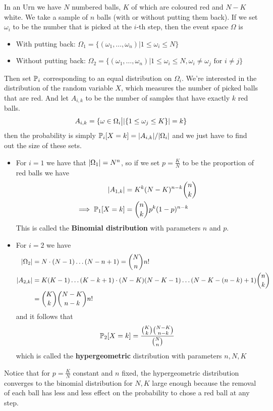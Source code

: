\begin{ex}
In an Urn we have $N$ numbered balls, $K$ of which are coloured red and $N-K$ white.
We take a sample of $n$ balls (with or without putting them back).
If we set $\omega_i$ to be the number that is picked at the $i$-th step, then the event space $\Omega$ is
\begin{itemize}
  \item With putting back: $\Omega_1 = \{(\omega_1, \ldots,\omega_n) \big\vert 1 \leq \omega_i \leq N\}$
  \item Without putting back: $\Omega_2 = \{(\omega_1, \ldots,\omega_n) \big\vert 1 \leq \omega_i \leq N, \omega_i \neq \omega_j  \text{ for } i \neq j\}$
\end{itemize}
Then set $\mathbb{P}_i$ corresponding to an equal distribution on $\Omega_i$. We're interested in the distribution of the random variable $X$, which measures the number of picked balls that are red.
And let $A_{i,k}$ to be the number of samples that have exactly $k$ red balls.
\begin{align*}
  A_{i,k} = \{\omega \in  \Omega_i \big\vert \vert\{1 \leq \omega_j \leq K\}\vert = k\}
\end{align*}
then the probability is simply $\mathbb{P}_i[X = k] = \vert A_{i,k}\vert/\vert\Omega_i\vert$ and we just have to find out the size of these sets.
\begin{itemize}
  \item For $i = 1$ we have that $\vert\Omega_1\vert = N^{n}$, so if we set $p = \frac{K}{N}$ to be the proportion of red balls we have
    \begin{align*}
      \vert A_{1,k}\vert &= K^{k}(N-K)^{n-k} \binom{n}{k}\\
      \implies \mathbb{P}_1[X = k] &= \binom{n}{k} p^{k}(1 - p)^{n-k}
    \end{align*}
    This is called the \textbf{Binomial distribution} with parameters $n$ and $p$.
  \item For $i = 2$ we have
    \begin{align*}
      \vert\Omega_2\vert &= N \cdot (N-1) \dots (N - n + 1) = \binom{N}{n}n!\\
      \vert A_{2,k}\vert &= K(K-1) \dots (K-k+1) \cdot (N-K)(N - K - 1) \dots (N-K - (n-k) + 1) \binom{n}{k}\\
                    &= \binom{K}{k} \binom{N-K}{n-k}n!
    \end{align*}
    and it follows that
    \begin{align*}
      \mathbb{P}_2[X = k] = \frac{\binom{K}{k} \binom{N-K}{n-k}}{\binom{N}{n}}
    \end{align*}
    which is called the \textbf{hypergeometric} distribution with parameters $n,N,K$
\end{itemize}
Notice that for $p= \frac{K}{N}$ constant and $n$ fixed, the hypergeometric distribution converges to the binomial distribution for $N,K$ large enough because the removal of each ball has less and less effect on the probability to chose a red ball at any step.
\end{ex}


